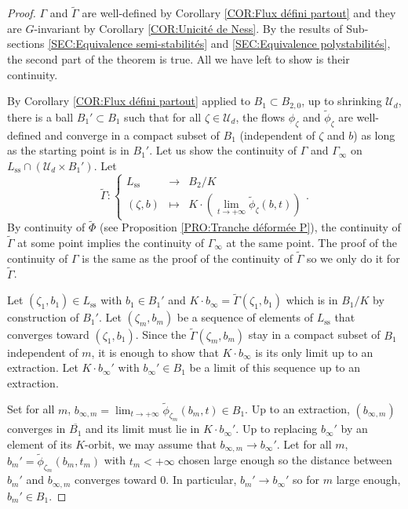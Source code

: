 \documentclass{article}
\theoremstyle{remark}
\theoremstyle{definition}
\newcommand{\mU}{\mathcal{U}}
\newcommand{\fonction}[4]{\left\{ \begin{array}{rcl}
		\displaystyle #1 & \longrightarrow & \displaystyle #2\\
		\displaystyle #3 & \longmapsto & \displaystyle #4
	\end{array} \right.}
\begin{document}
\begin{proof}
$\Gamma$ and $\tilde{\Gamma}$ are well-defined by Corollary \ref{COR:Flux défini partout} and they are $G$-invariant by Corollary \ref{COR:Unicité de Ness}. By the results of Sub-sections \ref{SEC:Equivalence semi-stabilités} and \ref{SEC:Equivalence polystabilités}, the second part of the theorem is true. All we have left to show is their continuity.

By Corollary \ref{COR:Flux défini partout} applied to $B_1 \subset B_{2,0}$, up to shrinking $\mU_d$, there is a ball $B_1' \subset B_1$ such that for all $\zeta \in \mU_d$, the flows $\phi_\zeta$ and $\tilde{\phi}_\zeta$ are well-defined and converge in a compact subset of $B_1$ (independent of $\zeta$ and $b$) as long as the starting point is in $B_1'$. Let us show the continuity of $\Gamma$ and $\Gamma_\infty$ on $L_{\mathrm{ss}} \cap (\mU_d \times B_1')$. Let
$$
\tilde{\Gamma} : \fonction{L_{\mathrm{ss}}}{B_2/K}{(\zeta,b)}{K \cdot \left(\lim_{t \rightarrow +\infty} \tilde{\phi}_\zeta(b,t)\right)}.
$$
By continuity of $\tilde{\Phi}$ (see Proposition \ref{PRO:Tranche déformée P}), the continuity of $\tilde{\Gamma}$ at some point implies the continuity of $\Gamma_\infty$ at the same point. The proof of the continuity of $\Gamma$ is the same as the proof of the continuity of $\tilde{\Gamma}$ so we only do it for $\tilde{\Gamma}$.

Let $(\zeta_1,b_1) \in L_{\mathrm{ss}}$ with $b_1 \in B_1'$ and $K \cdot b_\infty = \tilde{\Gamma}(\zeta_1,b_1)$ which is in $B_1/K$ by construction of $B_1'$. Let $(\zeta_m,b_m)$ be a sequence of elements of $L_{\mathrm{ss}}$ that converges toward $(\zeta_1,b_1)$. Since the $\tilde{\Gamma}(\zeta_m,b_m)$ stay in a compact subset of $B_1$ independent of $m$, it is enough to show that $K \cdot b_\infty$ is its only limit up to an extraction. Let $K \cdot b_\infty'$ with $b_\infty' \in B_1$ be a limit of this sequence up to an extraction.

Set for all $m$, $b_{\infty,m} = \lim_{t \rightarrow +\infty} \tilde{\phi}_{\zeta_m}(b_m,t) \in B_1$. Up to an extraction, $(b_{\infty,m})$ converges in $\overline{B_1}$ and its limit must lie in $K \cdot b_\infty'$. Up to replacing $b_\infty'$ by an element of its $K$-orbit, we may assume that $b_{\infty,m} \rightarrow b_\infty'$. Let for all $m$, $b_m' = \tilde{\phi}_{\zeta_m}(b_m,t_m)$ with $t_m < +\infty$ chosen large enough so the distance between $b_m'$ and $b_{\infty,m}$ converges toward $0$. In particular, $b_m' \rightarrow b_\infty'$ so for $m$ large enough, $b_m' \in B_1$.


\end{proof}
\end{document}
